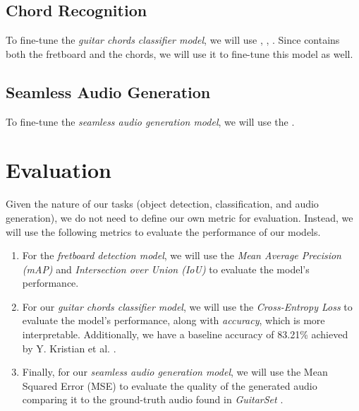 \documentclass[10pt,twocolumn,letterpaper]{article}
\begin{document}
\subsection{Chord Recognition}
To fine-tune the \emph{guitar chords classifier model}, we will use \cite{guitar-chord-tvon8_dataset}, \cite{guitar-chord-bounding-box_dataset}, \cite{guitar-chord-handshape_dataset}. Since \cite{guitar-chords-daewp_dataset} contains both the fretboard and the chords, we will use it to fine-tune this model as well.

\subsection{Seamless Audio Generation}
To fine-tune the \emph{seamless audio generation model}, we will use the \cite{Xi2018}.

\section{Evaluation}

Given the nature of our tasks (object detection, classification, and audio generation), we do not need to define our own metric for evaluation. Instead, we will use the following metrics to evaluate the performance of our models.

\begin{enumerate}[label=\arabic*), itemsep=0.25pt]
    \item For the \emph{fretboard detection model}, we will use the \emph{Mean Average Precision (mAP)} and \emph{Intersection over Union (IoU)} to evaluate the model's performance.
    \item For our \emph{guitar chords classifier model}, we will use the \emph{Cross-Entropy Loss} to evaluate the model's performance, along with \emph{accuracy}, which is more interpretable. Additionally, we have a baseline accuracy of 83.21\% achieved by Y. Kristian et al. \cite{Kristian_Zaman_Tenoyo_Jodhinata_2024}.
    \item Finally, for our \emph{seamless audio generation model}, we will use the Mean Squared Error (MSE) to evaluate the quality of the generated audio comparing it to the ground-truth audio found in \emph{GuitarSet} \cite{Xi2018}.
\end{enumerate}

{\small
    
    
}
\end{document}
